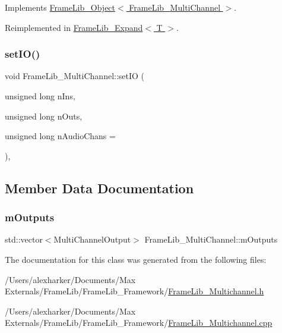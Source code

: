 Implements \hyperlink{class_frame_lib___object_a0d3bed42a21ebf248366f4457722beff}{Frame\+Lib\+\_\+\+Object$<$ Frame\+Lib\+\_\+\+Multi\+Channel $>$}.



Reimplemented in \hyperlink{class_frame_lib___expand_a73f7bf4264d45f56f249d6303b3e4c35}{Frame\+Lib\+\_\+\+Expand$<$ T $>$}.

\mbox{\label{class_frame_lib___multi_channel_aa602f450561447330df32fe73167244b}} 
\subsubsection{\texorpdfstring{set\+I\+O()}{setIO()}}
{\footnotesize\ttfamily void Frame\+Lib\+\_\+\+Multi\+Channel\+::set\+IO (\begin{DoxyParamCaption}\item[{unsigned long}]{n\+Ins,  }\item[{unsigned long}]{n\+Outs,  }\item[{unsigned long}]{n\+Audio\+Chans = {} }\end{DoxyParamCaption})\hspace{0.3cm}{\ttfamily [inline]}, {\ttfamily [protected]}}



\subsection{Member Data Documentation}
\mbox{\label{class_frame_lib___multi_channel_a2d993bc32c4625a1adbd84997c5d74f2}} 
\subsubsection{\texorpdfstring{m\+Outputs}{mOutputs}}
{\footnotesize\ttfamily std\+::vector$<$Multi\+Channel\+Output$>$ Frame\+Lib\+\_\+\+Multi\+Channel\+::m\+Outputs\hspace{0.3cm}{\ttfamily [protected]}}



The documentation for this class was generated from the following files\+:\begin{DoxyCompactItemize}
\item 
/\+Users/alexharker/\+Documents/\+Max Externals/\+Frame\+Lib/\+Frame\+Lib\+\_\+\+Framework/\hyperlink{_frame_lib___multichannel_8h}{Frame\+Lib\+\_\+\+Multichannel.\+h}\item 
/\+Users/alexharker/\+Documents/\+Max Externals/\+Frame\+Lib/\+Frame\+Lib\+\_\+\+Framework/\hyperlink{_frame_lib___multichannel_8cpp}{Frame\+Lib\+\_\+\+Multichannel.\+cpp}\end{DoxyCompactItemize}
